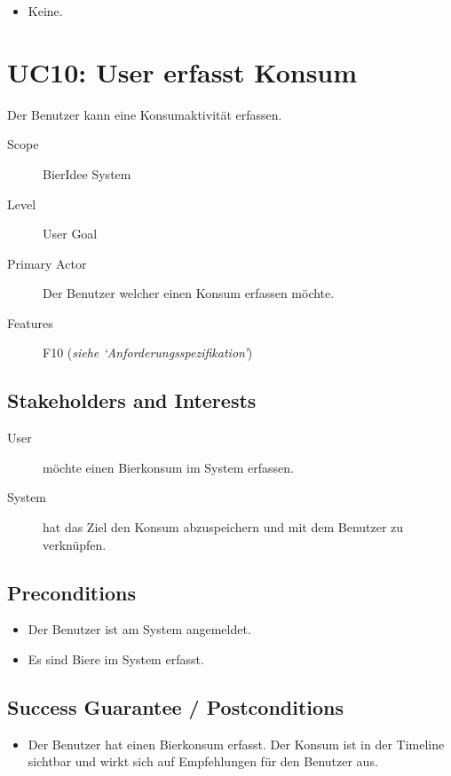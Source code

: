 \documentclass[10pt,a4paper]{scrartcl}
\begin{document}
\begin{itemize}
\item Keine.
\end{itemize}


\section*{UC10: User erfasst Konsum}
Der Benutzer kann eine Konsumaktivität erfassen.

\begin{description}
\item[Scope] BierIdee System
\item[Level] User Goal
\item[Primary Actor] Der Benutzer welcher einen Konsum erfassen möchte.
\item[Features] F10 (\textit{siehe `Anforderungsspezifikation'})
\end{description}


\subsection*{Stakeholders and Interests}

\begin{description}
\item[User] möchte einen Bierkonsum im System erfassen.
\item[System] hat das Ziel den Konsum abzuspeichern und mit dem Benutzer zu verknüpfen.
\end{description}


\subsection*{Preconditions}

\begin{itemize}
\item Der Benutzer ist am System angemeldet.
\item Es sind Biere im System erfasst.
\end{itemize}


\subsection*{Success Guarantee / Postconditions}
\begin{itemize}
\item Der Benutzer hat einen Bierkonsum erfasst. Der Konsum ist in der Timeline sichtbar und wirkt sich auf Empfehlungen für den Benutzer aus.
\end{itemize}
\end{document}
